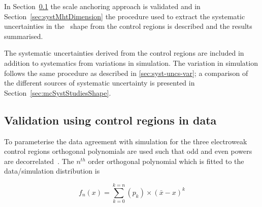 In Section~\ref{sec:valid13} the scale anchoring approach is validated and 
in Section~\ref{sec:systMhtDimension} the procedure used to 
extract the systematic uncertainties in the \mht~shape from the 
control regions is described and the results summarised.

The systematic uncertainties derived from the control regions
are included in addition to systematics from variations in simulation.
The variation in simulation follows the same procedure as described in
\ref{sec:syst-uncs-var}; a comparison of the different sources of systematic uncertainty
is presented in Section~\ref{sec:mcSystStudiesShape}.

\subsection{Validation using control regions in data}
\label{sec:valid13}
To parameterise the data agreement with simulation
for the three electroweak control regions
orthogonal polynomials are used such that odd and even powers 
are decorrelated~\cite{cohen2013applied}. 
The $n^{th}$ order orthogonal polynomial which is fitted to the data/simulation
distribution is 

\begin{equation}
  \label{equ:orthog-polynomial}
  f_n(x) = \sum_{k=0}^{k=n}{(p_k)\times(\bar{x}-x)^k}
\end{equation}

